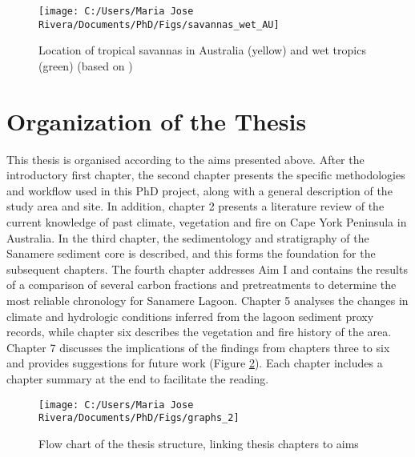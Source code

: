 \documentclass[
  12pt,
]{book}
\begin{document}
\begin{figure}

{\centering \texttt{[image: C:/Users/Maria Jose Rivera/Documents/PhD/Figs/savannas\_wet\_AU]} 

}

\caption{Location of tropical savannas in Australia (yellow) and wet tropics (green) (based on \citet{dinersteinEcoregionBasedApproachProtecting2017})}\label{fig:savanna}
\end{figure}



\hypertarget{organization-of-the-thesis}{%
\section{Organization of the Thesis}\label{organization-of-the-thesis}}

This thesis is organised according to the aims presented above. After the introductory first chapter, the second chapter presents the specific methodologies and workflow used in this PhD project, along with a general description of the study area and site. In addition, chapter 2 presents a literature review of the current knowledge of past climate, vegetation and fire on Cape York Peninsula in Australia. In the third chapter, the sedimentology and stratigraphy of the Sanamere sediment core is described, and this forms the foundation for the subsequent chapters. The fourth chapter addresses Aim I and contains the results of a comparison of several carbon fractions and pretreatments to determine the most reliable chronology for Sanamere Lagoon. Chapter 5 analyses the changes in climate and hydrologic conditions inferred from the lagoon sediment proxy records, while chapter six describes the vegetation and fire history of the area. Chapter 7 discusses the implications of the findings from chapters three to six and provides suggestions for future work (Figure \ref{fig:flow1}). Each chapter includes a chapter summary at the end to facilitate the reading.

\begin{figure}

{\centering \texttt{[image: C:/Users/Maria Jose Rivera/Documents/PhD/Figs/graphs\_2]} 

}

\caption{Flow chart of the thesis structure, linking thesis chapters to aims}\label{fig:flow1}
\end{figure}
\end{document}
